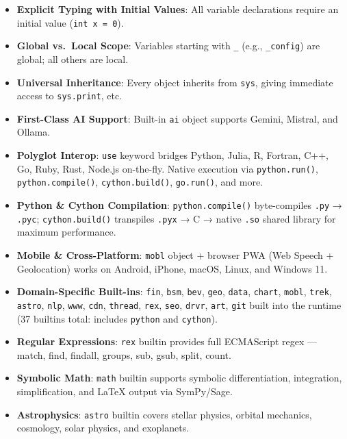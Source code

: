 \documentclass[
]{article}
\providecommand{\tightlist}{%
  \setlength{\itemsep}{0pt}\setlength{\parskip}{0pt}}
\begin{document}
\begin{itemize}
\tightlist
\item
  \textbf{Explicit Typing with Initial Values}: All variable
  declarations require an initial value (\texttt{int\ x\ =\ 0}).
\item
  \textbf{Global vs.~Local Scope}: Variables starting with \texttt{\_}
  (e.g., \texttt{\_config}) are global; all others are local.
\item
  \textbf{Universal Inheritance}: Every object inherits from
  \texttt{sys}, giving immediate access to \texttt{sys.print}, etc.
\item
  \textbf{First-Class AI Support}: Built-in \texttt{ai} object supports
  Gemini, Mistral, and Ollama.
\item
  \textbf{Polyglot Interop}: \texttt{use} keyword bridges Python, Julia,
  R, Fortran, C++, Go, Ruby, Rust, Node.js on-the-fly. Native execution
  via \texttt{python.run()}, \texttt{python.compile()},
  \texttt{cython.build()}, \texttt{go.run()}, and more.
\item
  \textbf{Python \& Cython Compilation}: \texttt{python.compile()}
  byte-compiles \texttt{.py} → \texttt{.pyc}; \texttt{cython.build()}
  transpiles \texttt{.pyx} → C → native \texttt{.so} shared library for
  maximum performance.
\item
  \textbf{Mobile \& Cross-Platform}: \texttt{mobl} object + browser PWA
  (Web Speech + Geolocation) works on Android, iPhone, macOS, Linux, and
  Windows 11.
\item
  \textbf{Domain-Specific Built-ins}: \texttt{fin}, \texttt{bsm},
  \texttt{bev}, \texttt{geo}, \texttt{data}, \texttt{chart},
  \texttt{mobl}, \texttt{trek}, \texttt{astro}, \texttt{nlp},
  \texttt{www}, \texttt{cdn}, \texttt{thread}, \texttt{rex},
  \texttt{seo}, \texttt{drvr}, \texttt{art}, \texttt{git} built into the
  runtime (37 builtins total: includes \texttt{python} and
  \texttt{cython}).
\item
  \textbf{Regular Expressions}: \texttt{rex} builtin provides full
  ECMAScript regex --- match, find, findall, groups, sub, gsub, split,
  count.
\item
  \textbf{Symbolic Math}: \texttt{math} builtin supports symbolic
  differentiation, integration, simplification, and LaTeX output via
  SymPy/Sage.
\item
  \textbf{Astrophysics}: \texttt{astro} builtin covers stellar physics,
  orbital mechanics, cosmology, solar physics, and exoplanets.
\end{itemize}
\end{document}
